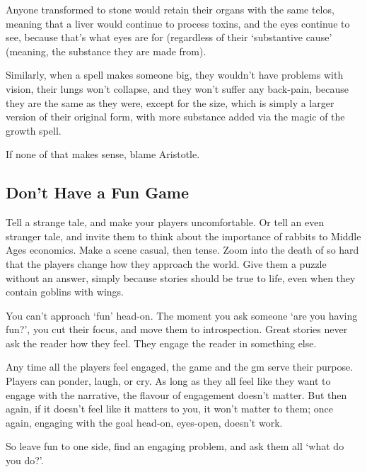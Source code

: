 \begin{multicols}{2}
Anyone transformed to stone would retain their organs with the same telos, meaning that a liver would continue to process toxins, and the eyes continue to see, because that's what eyes are for (regardless of their `substantive cause' (meaning, the substance they are made from).

Similarly, when a spell makes someone big, they wouldn't have problems with vision, their lungs won't collapse, and they won't suffer any back-pain, because they are the same as they were, except for the size, which is simply a larger version of their original form, with more substance added via the magic of the growth spell.

If none of that makes sense, blame Aristotle.

\subsection{Don't Have a Fun Game}

Tell a strange tale, and make your players uncomfortable.
Or tell an even stranger tale, and invite them to think about the importance of rabbits to Middle Ages economics.
Make a scene casual, then tense.
Zoom into the death of  so hard that the players change how they approach the world.
Give them a puzzle without an answer, simply because stories should be true to life, even when they contain goblins with wings.

You can't approach `fun' head-on.
The moment you ask someone `are you having fun?', you cut their focus, and move them to introspection.
Great stories never ask the reader how they feel.
They engage the reader in something else.

Any time all the players feel engaged, the game and the \gls{gm} serve their purpose.
Players can ponder, laugh, or cry.
As long as they all feel like they want to engage with the narrative, the flavour of engagement doesn't matter.
But then again, if it doesn't feel like it matters to you, it won't matter to them; once again, engaging with the goal head-on, eyes-open, doesn't work.

So leave fun to one side, find an engaging problem, and ask them all `what do you do?'.

\end{multicols}
